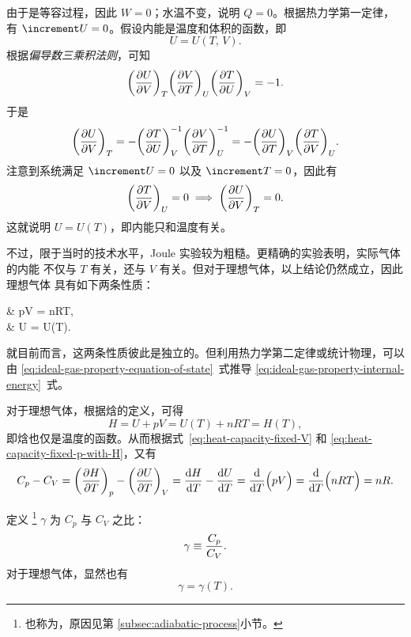 由于是等容过程，因此 $W=0$；水温不变，说明 $Q=0$。根据热力学第一定律，有
$\incr{U}=0$。假设内能是温度和体积的函数，即
\begin{equation}
  U = U(T, \, V).
\end{equation}
根据\emph{偏导数三乘积法则}，可知
\begin{equation}
  \qty(\pdv{U}{V})_T \qty(\pdv{V}{T})_U \qty(\pdv{T}{U})_V = -1.
\end{equation}
于是
\begin{equation}
  \qty(\pdv{U}{V})_T
  = -\qty(\pdv{T}{U})_V^{-1} \qty(\pdv{V}{T})_U^{-1}
  = -\qty(\pdv{U}{T})_V \qty(\pdv{T}{V})_U.
\end{equation}
注意到系统满足 $\incr{U}=0$ 以及 $\incr{T}=0$，因此有
\begin{equation}
  \qty(\pdv{T}{V})_U = 0 \implies \qty(\pdv{U}{V})_T = 0.
\end{equation}
这就说明 $U = U(T)$，即内能只和温度有关。

不过，限于当时的技术水平，Joule 实验较为粗糙。更精确的实验表明，实际气体的内能
不仅与 $T$ 有关，还与 $V$ 有关。但对于理想气体，以上结论仍然成立，因此理想气体
具有如下两条性质：
\begin{braced}
  & pV = nRT,  \label{eq:ideal-gas-property-equation-of-state}\\
  & U  = U(T). \label{eq:ideal-gas-property-internal-energy}
\end{braced}
就目前而言，这两条性质彼此是独立的。但利用热力学第二定律或统计物理，可以由
\eqref{eq:ideal-gas-property-equation-of-state}~式推导
\eqref{eq:ideal-gas-property-internal-energy}~式。

对于理想气体，根据焓的定义，可得
\begin{equation}
  H = U + pV = U(T) + nRT = H(T),
\end{equation}
即焓也仅是温度的函数。从而根据式~\eqref{eq:heat-capacity-fixed-V} 和
\eqref{eq:heat-capacity-fixed-p-with-H}，又有
\begin{equation}
  C_p - C_V = \qty(\pdv{H}{T})_p - \qty(\pdv{U}{T})_V
  = \dv{H}{T} - \dv{U}{T} = \dv{T} \qty\Big(pV) = \dv{T} \qty\Big(nRT) = nR.
  \label{eq:C_p-C_V-for-ideal-gas}
\end{equation}

定义 \footnote{也称为，原因见第%
  \ref{subsec:adiabatic-process}小节。} $\gamma$ 为 $C_p$ 与 $C_V$ 之比：
\begin{equation} \label{eq:heat-capacity-ratio}
  \gamma \equiv \frac{C_p}{C_V}.
\end{equation}
对于理想气体，显然也有
\begin{equation}
  \gamma = \gamma(T).
\end{equation}

